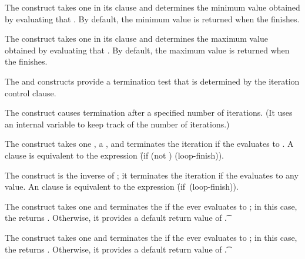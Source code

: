\itemitem{--}  
  The  construct takes one  in its clause 
  and determines the minimum value obtained by evaluating that .
  By default, the minimum value is returned when the  finishes.
 
\itemitem{--}  
  The  construct takes one  in its clause and 
  determines the maximum value obtained by evaluating that .
  By default, the maximum value is returned when the  finishes.
\endlist 

\endsubsubsubsection%

 
\beginlist
\itemitem{--}  
  The  and  constructs provide a termination test
  that is determined by the iteration control clause.
 
\itemitem{--}  
  The  construct causes termination after a specified
  number of iterations.
  (It uses an internal variable to keep track of the number of iterations.)
 
\itemitem{--}  
  The  construct takes one , a , 
  and terminates the iteration if the  evaluates to .
  A  clause is equivalent to the expression 
  \f{(if (not ) (loop-finish))}.
 
\itemitem{--}  
   The  construct is the inverse of ;
   it terminates the iteration if the  evaluates to
   any  value.
   An  clause is equivalent to the expression
   \hbox{\f{(if  (loop-finish))}}.
 
\itemitem{--}  
  The  construct takes one  and
  terminates the  if the  ever evaluates to ;
  in this case, the   returns \nil.
  Otherwise, it provides a default return value of \t.
 
\itemitem{--}  
  The  construct takes one  and
  terminates the  if the  ever evaluates to ;
  in this case, the   returns \nil.
  Otherwise, it provides a default return value of \t.
 
